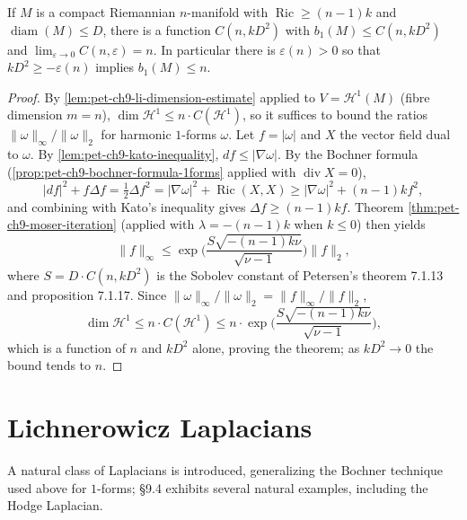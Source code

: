 \begin{theorem}
  \label{thm:pet-ch9-gromov-gallot-betti1-estimate}
  If $M$ is a compact Riemannian $n$-manifold with $\operatorname{Ric}\ge(n-1)k$ and
  $\operatorname{diam}(M)\le D$, there is a function $C(n,kD^2)$ with
  $b_1(M)\le C(n,kD^2)$ and $\lim_{\varepsilon\to0}C(n,\varepsilon)=n$. In
  particular there is $\varepsilon(n)>0$ so that $kD^2\ge-\varepsilon(n)$
  implies $b_1(M)\le n$.
\end{theorem}
\begin{proof}
  By \cref{lem:pet-ch9-li-dimension-estimate} applied to
  $V=\mathcal{H}^1(M)$ (fibre dimension $m=n$),
  $\dim\mathcal{H}^1\le n\cdot C(\mathcal{H}^1)$, so it suffices to bound the
  ratios $\|\omega\|_\infty/\|\omega\|_2$ for harmonic $1$-forms $\omega$. Let
  $f=|\omega|$ and $X$ the vector field dual to $\omega$. By
  \cref{lem:pet-ch9-kato-inequality}, $df\le|\nabla\omega|$. By the Bochner
  formula (\cref{prop:pet-ch9-bochner-formula-1forms} applied with
  $\operatorname{div}X=0$),
  \[
    |df|^2+f\Delta f=\tfrac12\Delta f^2=|\nabla\omega|^2+\operatorname{Ric}(X,X)
    \ge|\nabla\omega|^2+(n-1)kf^2,
  \]
  and combining with Kato's inequality gives $\Delta f\ge(n-1)kf$. Theorem
  \ref{thm:pet-ch9-moser-iteration} (applied with $\lambda=-(n-1)k$ when
  $k\le0$) then yields
  \[
    \|f\|_\infty\le\exp\Big(\frac{S\sqrt{-(n-1)k\nu}}{\sqrt{\nu-1}}\Big)\|f\|_2,
  \]
  where $S=D\cdot C(n,kD^2)$ is the Sobolev constant of Petersen's theorem
  7.1.13 and proposition 7.1.17. Since $\|\omega\|_\infty/\|\omega\|_2=
  \|f\|_\infty/\|f\|_2$,
  \[
    \dim\mathcal{H}^1\le n\cdot C(\mathcal{H}^1)
    \le n\cdot\exp\Big(\frac{S\sqrt{-(n-1)k\nu}}{\sqrt{\nu-1}}\Big),
  \]
  which is a function of $n$ and $kD^2$ alone, proving the theorem; as
  $kD^2\to0$ the bound tends to $n$.
\end{proof}

\section{Lichnerowicz Laplacians}

A natural class of Laplacians is introduced, generalizing the Bochner
technique used above for $1$-forms; §9.4 exhibits several natural examples,
including the Hodge Laplacian.

